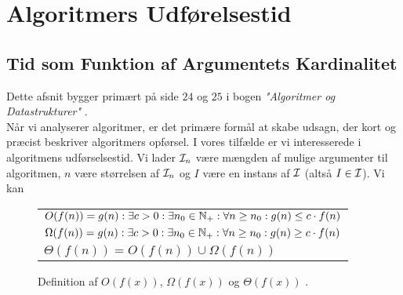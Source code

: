 \chapter{Algoritmers Udførelsestid}
\label{ch:Algoritmers Udførelsestid}

\section{Tid som Funktion af Argumentets Kardinalitet}
\label{sec:Tid som Funktion af Argumentets Kardinalitet}

Dette afsnit bygger primært på side $24$ og $25$ i bogen \emph{"Algoritmer og Datastrukturer"} \cite{aogd}.\\

Når vi analyserer algoritmer, er det primære formål at skabe udsagn, der kort og præcist beskriver algoritmers opførsel. I vores tilfælde er vi interesserede i algoritmens udførselsestid. Vi lader $\mathcal{I} _n$ være mængden af mulige argumenter til algoritmen, $n$ være størrelsen af $\mathcal{I} _n$ og $I$ være en instans af $\mathcal{I}$ (altså $I \in \mathcal{I}$). Vi kan 

\begin{figure}
	\begin{center}
		\padtable
		\begin{tabular}{l}
			\hline
			$O(f(n)) = {g(n): \exists c > 0: \exists n_0 \in \mathbb{N}_+: \forall n \geq n_0: g(n) \leq c \cdot f(n)}$\\
			$\Omega (f(n)) = {g(n): \exists c > 0: \exists n_0 \in \mathbb{N}_+: \forall n \geq n_0: g(n) \geq c \cdot f(n)}$\\
			$\Theta (f(n)) = O(f(n)) \cup \Omega (f(n))$\\
			\hline
		\end{tabular}
	\end{center}
	\caption{Definition af $O(f(x))$, $\Omega (f(x))$ og $\Theta (f(x))$ \cite[s. 26]{aogd}.}
	\label{fig:Store-O definition}
\end{figure}


